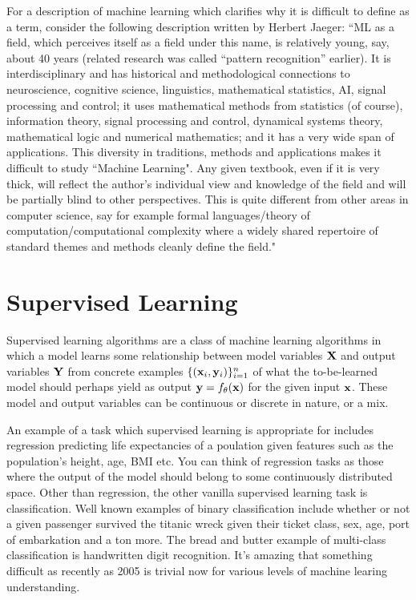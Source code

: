 \documentclass[11pt]{article}
\begin{document}
For a description of machine learning which clarifies why it is difficult to define as a term, consider the following description written by Herbert Jaeger: ``ML as a ﬁeld, which perceives itself as a ﬁeld under this name, is relatively young, say, about 40 years (related research was called “pattern recognition” earlier). It is interdisciplinary and has historical and methodological connections to neuroscience, cognitive science, linguistics, mathematical statistics, AI, signal processing and control; it uses mathematical methods from statistics (of course), information theory, signal processing and control, dynamical systems theory, mathematical logic and numerical mathematics; and it has a very wide span of applications. This diversity in traditions, methods and applications makes it diﬃcult to study ``Machine Learning". Any given textbook, even if it is very thick, will reﬂect the author's individual view and knowledge of the ﬁeld and will be partially blind to other perspectives. This is quite diﬀerent from other areas in computer science, say for example formal languages/theory of computation/computational complexity where a widely shared repertoire of standard themes and methods cleanly deﬁne the ﬁeld."

\section{Supervised Learning}

Supervised learning algorithms are a class of machine learning algorithms in which a model learns some relationship between model variables $\mathbf{X}$ and output variables $\mathbf{Y}$ from concrete examples $\{(\mathbf{x}_i,\mathbf{y}_i)\}_{i=1}^n$ of what the to-be-learned model should perhaps yield as output $\mathbf{y}=f_{\theta}(\mathbf{x})$ for the given input $\mathbf{x}$. These model and output variables can be continuous or discrete in nature, or a mix.

An example of a task which supervised learning is appropriate for includes regression predicting life expectancies of a poulation given features such as the population's height, age, BMI etc. You can think of regression tasks as those where the output of the model should belong to some continuously distributed space. Other than regression, the other vanilla supervised learning task is classification. Well known examples of binary classification include whether or not a given passenger survived the titanic wreck given their ticket class, sex, age, port of embarkation and a ton more. The bread and butter example of multi-class classification is handwritten digit recognition. It's amazing that something difficult as recently as 2005 is trivial now for various levels of machine learing understanding.
\end{document}
